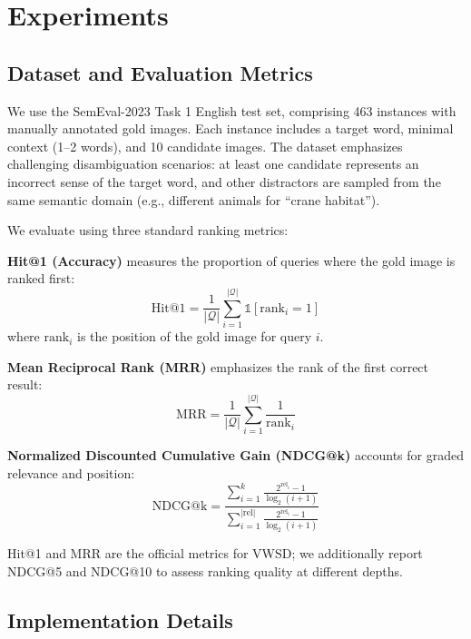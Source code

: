\documentclass[11pt]{article}
\begin{document}
\section{Experiments}
\label{sec:experiments}

\subsection{Dataset and Evaluation Metrics}

We use the SemEval-2023 Task 1 English test set, comprising 463 instances with manually annotated gold images. Each instance includes a target word, minimal context (1--2 words), and 10 candidate images. The dataset emphasizes challenging disambiguation scenarios: at least one candidate represents an incorrect sense of the target word, and other distractors are sampled from the same semantic domain (e.g., different animals for ``crane habitat'').

We evaluate using three standard ranking metrics:

\textbf{Hit@1 (Accuracy)} measures the proportion of queries where the gold image is ranked first:
\begin{equation}
\text{Hit@1} = \frac{1}{|\mathcal{Q}|} \sum_{i=1}^{|\mathcal{Q}|} \mathbb{1}[\text{rank}_i = 1]
\end{equation}
where $\text{rank}_i$ is the position of the gold image for query $i$.

\textbf{Mean Reciprocal Rank (MRR)} emphasizes the rank of the first correct result:
\begin{equation}
\text{MRR} = \frac{1}{|\mathcal{Q}|} \sum_{i=1}^{|\mathcal{Q}|} \frac{1}{\text{rank}_i}
\end{equation}

\textbf{Normalized Discounted Cumulative Gain (NDCG@k)} accounts for graded relevance and position:
\begin{equation}
\text{NDCG@k} = \frac{\sum_{i=1}^{k} \frac{2^{\text{rel}_i} - 1}{\log_2(i+1)}}{\sum_{i=1}^{|\text{rel}|} \frac{2^{\text{rel}_i} - 1}{\log_2(i+1)}}
\end{equation}

Hit@1 and MRR are the official metrics for VWSD; we additionally report NDCG@5 and NDCG@10 to assess ranking quality at different depths.

\subsection{Implementation Details}
\end{document}
